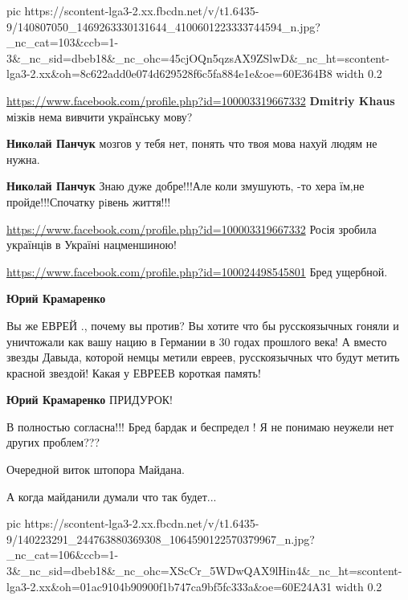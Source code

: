 
\ifcmt
  pic https://scontent-lga3-2.xx.fbcdn.net/v/t1.6435-9/140807050_1469263330131644_4100601223333744594_n.jpg?_nc_cat=103&ccb=1-3&_nc_sid=dbeb18&_nc_ohc=45cjOQn5qzsAX9ZSlwD&_nc_ht=scontent-lga3-2.xx&oh=8c622add0e074d629528f6c5fa884e1e&oe=60E364B8
  width 0.2
\fi

\url{https://www.facebook.com/profile.php?id=100003319667332}
\textbf{Dmitriy Khaus} мізків нема вивчити українську мову?

\textbf{Николай Панчук} мозгов у тебя нет, понять что твоя мова нахуй людям не нужна.

\textbf{Николай Панчук} Знаю дуже добре!!!Але коли змушують, -то хера їм,не
пройде!!!Спочатку рiвень життя!!!

\url{https://www.facebook.com/profile.php?id=100003319667332}
Росія зробила українців в Україні нацменшиною!

\url{https://www.facebook.com/profile.php?id=100024498545801}
Бред ущербной.

\textbf{Юрий Крамаренко}

Вы же ЕВРЕЙ ., почему вы против? Вы хотите что бы русскоязычных гоняли и
уничтожали как вашу нацию в Германии в 30 годах прошлого века! А вместо звезды
Давыда, которой немцы метили евреев, русскоязычных что будут метить красной
звездой! Какая у ЕВРЕЕВ короткая память!

\textbf{Юрий Крамаренко} ПРИДУРОК!

В полностью согласна!!! Бред бардак и беспредел ! Я не понимаю неужели нет других проблем???

Очередной виток штопора Майдана.


А когда майданили думали что так будет...


\ifcmt
  pic https://scontent-lga3-2.xx.fbcdn.net/v/t1.6435-9/140223291_244763880369308_1064590122570379967_n.jpg?_nc_cat=106&ccb=1-3&_nc_sid=dbeb18&_nc_ohc=XScCr_5WDwQAX9lHin4&_nc_ht=scontent-lga3-2.xx&oh=01ac9104b90900f1b747ca9bf5fc333a&oe=60E24A31
  width 0.2
\fi

